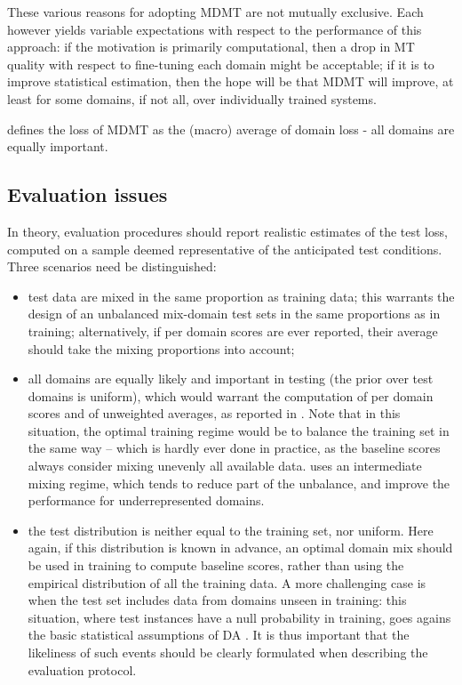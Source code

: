 \documentclass[11pt]{article}
\begin{document}
These various reasons for adopting MDMT are not mutually exclusive. Each however yields variable expectations with respect to the performance of this approach: if the motivation is primarily computational, then a drop in MT quality with respect to fine-tuning each domain might be acceptable; if it is to improve statistical estimation, then the hope will be that MDMT will improve, at least for some domains, if not all, over individually trained systems.

\cite[eq. (3)]{Wang20general} defines the loss of MDMT as the (macro) average of domain loss - all domains are equally important.

\subsection{Evaluation issues \label{ssec:evaluation}}

In theory, evaluation procedures should report realistic estimates of the test loss, computed on a sample deemed representative of the anticipated test conditions. Three scenarios need be distinguished:
\begin{itemize}
\item test data are mixed in the same proportion as training data; this warrants the design of an unbalanced mix-domain test sets in the same proportions as in training; alternatively, if per domain scores are ever reported, their average should take the mixing proportions into account;
\item all domains are equally likely and important in testing (the prior over test domains is uniform), which would warrant the computation of per domain scores and of unweighted averages, as reported in \cite{Farajian17multidomain,Su19exploring}. Note that in this situation, the optimal training regime would be to balance the training set in the same way -- which is hardly ever done in practice, as the baseline scores always consider mixing unevenly all available data. \cite{Wang20general} uses an intermediate mixing regime, which tends to reduce part of the unbalance, and improve the performance for underrepresented domains.
\item the test distribution is neither equal to the training set, nor uniform. Here again, if this distribution is known in advance, an optimal domain mix should be used in training to compute baseline scores, rather than using the empirical distribution of all the training data. A more challenging case is when the test set includes data from domains unseen in training: this situation, where test instances have a null probability in training, goes agains the basic statistical assumptions of DA \cite{Shimodaira00improving}. It is thus important that the likeliness of such events should be clearly formulated when describing the evaluation protocol.
\end{itemize}
\end{document}

